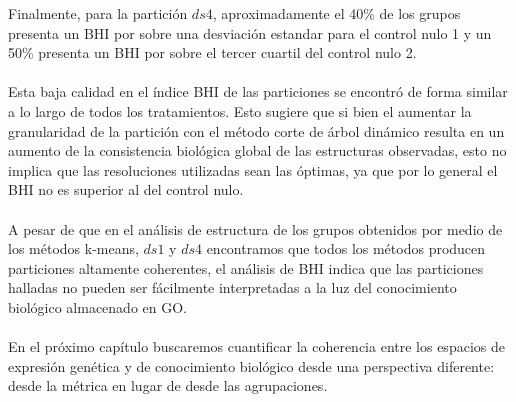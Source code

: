 Finalmente, para la partición $ds4$, aproximadamente el 40\% de los grupos presenta un BHI por sobre una desviación estandar para el control nulo 1 y un 50\% presenta un BHI por sobre el tercer cuartil del control nulo 2.\\\\ 
Esta baja calidad en el índice BHI de las particiones se encontró de forma similar a lo largo de todos los tratamientos. Esto sugiere que si bien el aumentar la granularidad de la partición con el método corte de árbol dinámico resulta en un aumento de la consistencia biológica global de las estructuras observadas, esto no implica que las resoluciones utilizadas sean las óptimas, ya que por lo general el BHI no es superior al del control nulo.\\\\
A pesar de que en el análisis de estructura de los grupos obtenidos por medio de los métodos k-means, $ds1$ y $ds4$ encontramos que todos los métodos producen particiones altamente coherentes, el análisis de BHI indica que las particiones halladas no pueden ser fácilmente interpretadas a la luz del conocimiento biológico almacenado en GO.\\\\
En el próximo capítulo buscaremos cuantificar la coherencia entre los espacios de expresión genética y de conocimiento biológico desde una perspectiva diferente: desde la métrica en lugar de desde las agrupaciones.
